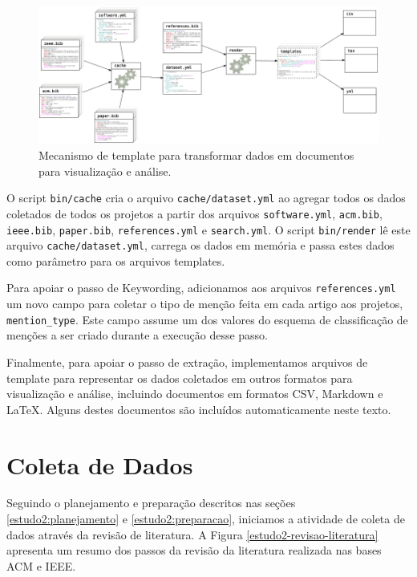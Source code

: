 \begin{figure}[h]
  \center
  \includegraphics[scale=0.3]{imagens/template-fluxograma.png}
  \caption{Mecanismo de template para transformar dados em documentos para visualização e análise.}
  \label{template-fluxograma}
\end{figure}

O script \texttt{bin/cache} cria o arquivo \texttt{cache/dataset.yml} ao
agregar todos os dados coletados de todos os projetos a partir dos arquivos
\texttt{software.yml}, \texttt{acm.bib}, \texttt{ieee.bib}, \texttt{paper.bib},
\texttt{references.yml} e \texttt{search.yml}.
O script \texttt{bin/render} lê este arquivo \texttt{cache/dataset.yml},
carrega os dados em memória e passa estes dados como parâmetro para os arquivos
templates.

Para apoiar o passo de Keywording, 
adicionamos aos arquivos \texttt{references.yml} um novo campo para coletar o
tipo de menção feita em cada artigo aos projetos, \texttt{mention\_type}. 
Este campo assume um dos valores do esquema de classificação de menções 
a ser criado durante a execução desse passo.

Finalmente, para apoiar o passo de extração, 
implementamos arquivos de template para representar os dados coletados em
outros formatos para visualização e análise, incluindo documentos em formatos
CSV, Markdown e \LaTeX. Alguns destes documentos são incluídos automaticamente
neste texto.


\section{Coleta de Dados} \label{estudo2:coleta} %

Seguindo o planejamento e preparação descritos nas seções
\ref{estudo2:planejamento} e \ref{estudo2:preparacao}, iniciamos a atividade de coleta de
dados através da revisão de literatura.
A Figura \ref{estudo2-revisao-literatura} apresenta um resumo dos passos da revisão da literatura
realizada nas bases ACM e IEEE.

